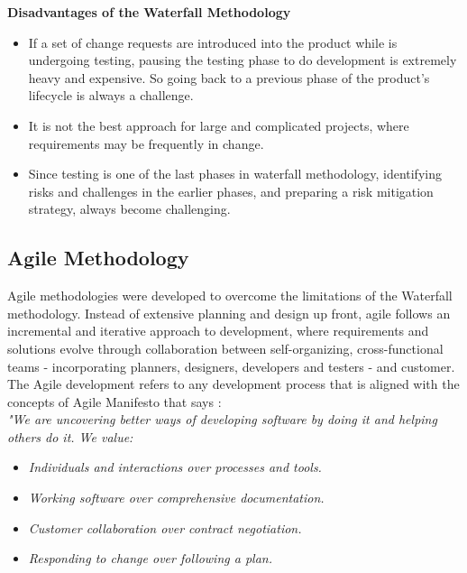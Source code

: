 \textbf{Disadvantages of the Waterfall Methodology}
\begin{itemize}
\item If a set of change requests are introduced into the product while is undergoing testing, pausing the testing phase to do development is extremely heavy and expensive. So going back to a previous phase of the product's lifecycle is always a challenge.\\

\item It is not the best approach for large and complicated projects, where requirements may be frequently in change.\\

\item Since testing is one of the last phases in waterfall methodology, identifying risks and challenges in the earlier phases, and preparing a risk mitigation strategy, always become challenging.\\

\end{itemize}

\subsection{Agile Methodology}
Agile methodologies were developed to overcome the limitations of the Waterfall methodology. Instead of extensive planning and design up front, agile follows an incremental and iterative approach to development, where requirements and solutions evolve through collaboration between self-organizing, cross-functional teams - incorporating planners, designers, developers and testers - and customer. The Agile development refers to any development process that is aligned with the concepts of Agile Manifesto that says \cite{agile:manifesto}:\\

\textit{"We are uncovering better ways of developing software by doing it and helping others do it. We value:}

\begin{itemize}
\item \textit{Individuals and interactions over processes and tools.}
\item \textit{Working software over comprehensive documentation.}
\item \textit{Customer collaboration over contract negotiation.}
\item \textit{Responding to change over following a plan.}
\end{itemize}

